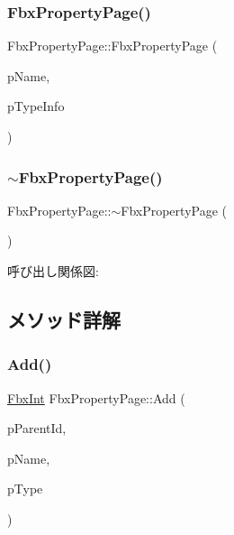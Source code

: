 \subsubsection{\texorpdfstring{Fbx\+Property\+Page()}{FbxPropertyPage()}\hspace{0.1cm}{\footnotesize\ttfamily [3/3]}}
{\footnotesize\ttfamily Fbx\+Property\+Page\+::\+Fbx\+Property\+Page (\begin{DoxyParamCaption}\item[{const char $\ast$}]{p\+Name,  }\item[{\hyperlink{class_fbx_property_page}{Fbx\+Property\+Page} $\ast$}]{p\+Type\+Info }\end{DoxyParamCaption})\hspace{0.3cm}{\ttfamily [protected]}}

\mbox{\label{class_fbx_property_page_a948765127c1ab18f2236023cc2255cf5}} 
\subsubsection{\texorpdfstring{$\sim$\+Fbx\+Property\+Page()}{~FbxPropertyPage()}}
{\footnotesize\ttfamily Fbx\+Property\+Page\+::$\sim$\+Fbx\+Property\+Page (\begin{DoxyParamCaption}{ }\end{DoxyParamCaption})\hspace{0.3cm}{\ttfamily [protected]}}

呼び出し関係図\+:


\subsection{メソッド詳解}
\mbox{\label{class_fbx_property_page_ab12a17d12053e72e8ad86fdde1cea66a}} 
\subsubsection{\texorpdfstring{Add()}{Add()}\hspace{0.1cm}{\footnotesize\ttfamily [1/2]}}
{\footnotesize\ttfamily \hyperlink{fbxtypes_8h_a088fa96de3b0b3ea69f0f6afef525dfb}{Fbx\+Int} Fbx\+Property\+Page\+::\+Add (\begin{DoxyParamCaption}\item[{\hyperlink{fbxtypes_8h_a088fa96de3b0b3ea69f0f6afef525dfb}{Fbx\+Int}}]{p\+Parent\+Id,  }\item[{const char $\ast$}]{p\+Name,  }\item[{\hyperlink{fbxpropertytypes_8h_a73913a5ddfb20e57c6f25e9e6784bd92}{E\+Fbx\+Type}}]{p\+Type }\end{DoxyParamCaption})}

